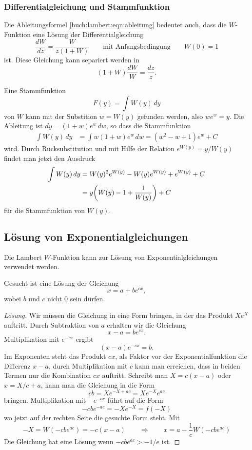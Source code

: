%
%
\subsubsection{Differentialgleichung und Stammfunktion}
%
Die Ableitungsformel \eqref{buch:lambert:eqn:ableitung} bedeutet auch,
dass die $W$-Funktion eine Lösung der Differentialgleichung
\[
\frac{dW}{dz}
=
\frac{W}{z(1+W)}
\qquad
\text{mit Anfangsbedingung}
\qquad
W(0) = 1
\]
ist.
Diese Gleichung kann separiert werden in
\[
(1+W)\frac{dW}{W} = \frac{dz}{z}.
\]

Eine Stammfunktion
%
\[
F(y)
=
\int W(y)\,dy
\]
von $W$ kann mit der Substition $w=W(y)$ gefunden
werden, also $we^w=y$.
Die Ableitung ist $dy = (1+w)e^w\,dw$, so dass die Stammfunktion
\begin{align*}
\int W(y)\,dy
&=
\int w (1+w)e^w\,dw
=
(w^2-w+1)e^w+C
\end{align*}
wird.
Durch Rücksubstitution und mit Hilfe der Relation $e^{W(y)} = y/W(y)$
findet man jetzt den Ausdruck
\begin{align}
\int W(y)\,dy
&=
W(y)^2 e^{W(y)} - W(y)e^{W(y)} + e^{W(y)} + C
\notag
\\
&=
y\biggl(W(y) - 1 + \frac{1}{W(y)}\biggr) + C
\label{buch:lambert:eqn:stammfunktion}
\end{align}
für die Stammfunktion von $W(y)$.

%
%
\subsection{Lösung von Exponentialgleichungen
\label{buch:subsection:loesung-von-exponentialgleichungen}}
Die Lambert $W$-Funktion kann zur Lösung von Exponentialgleichungen
verwendet werden.
%
%

\begin{aufgabe}
Gesucht ist eine Lösung der Gleichung
\[
x=a+be^{cx},
\]
wobei $b$ und $c$ nicht $0$ sein dürfen.
\end{aufgabe}

\begin{proof}[Lösung]
Wir müssen die Gleichung in eine Form bringen, in der das Produkt 
$Xe^X$ auftritt.
Durch Subtraktion von $a$ erhalten wir die Gleichung 
\[
x-a = be^{cx}.
\]
Multiplikation mit $e^{-cx}$ ergibt
\[
(x-a)e^{-cx}=b.
\]
Im Exponenten steht das Produkt $cx$, als Faktor vor der Exponentialfunktion
die Differenz $x-a$, durch Multiplikation mit $c$ kann man erreichen,
dass in beiden Termen nur die Kombination $cx$ auftritt.
Schreibt man $X=c(x-a)$ oder $x=X/c+a$, kann man die Gleichung in die Form
\[
cb
=
Xe^{-X+ac}
=
Xe^{-X}e^{ac}
\]
bringen.
Multiplikation mit $-e^{-ac}$ führt auf die Form
\[
-cbe^{-ac}
=
-Xe^{-X}
=
f(-X)
\]
wo jetzt auf der rechten Seite die gesuchte Form steht.
Mit 
\[
-X
=
W(-cbe^{ac})
=
-c(x-a)
\qquad\Rightarrow\qquad
x
=
a
-
\frac{1}{c}
W(-cbe^{ac})
\]
Die Gleichung hat eine Lösung wenn $-cbe^{ac} > -1/e$ ist.
\end{proof}

